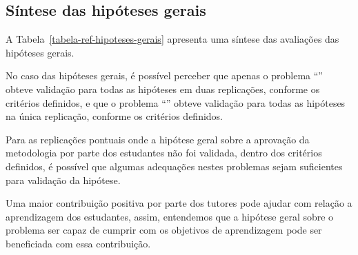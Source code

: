 \subsection{Síntese das hipóteses gerais}
A Tabela~\ref{tabela-ref-hipoteses-gerais} apresenta
uma síntese das avaliações das hipóteses gerais.


No caso das hipóteses gerais, é possível perceber que apenas
o problema ``\ProblemaD'' obteve validação para todas as hipóteses
em duas replicações, conforme os critérios definidos, e que o
problema ``\ProblemaA'' obteve validação para todas as
hipóteses na única replicação, conforme os
critérios definidos.

Para as replicações pontuais onde a hipótese geral sobre
a aprovação da metodologia por parte dos estudantes não foi validada,
dentro dos critérios definidos, é possível que algumas adequações
nestes problemas sejam suficientes para
validação da hipótese.

Uma maior contribuição positiva por parte dos tutores pode ajudar
com relação a aprendizagem dos estudantes, assim, entendemos que
a hipótese geral sobre o problema ser capaz
de cumprir com os objetivos de aprendizagem pode
ser beneficiada com essa contribuição.
